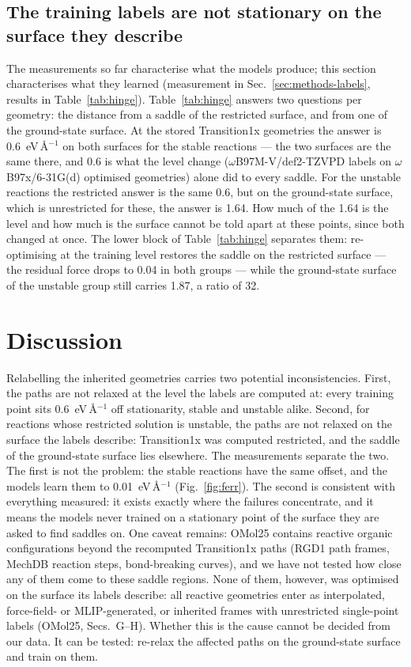 \subsection{The training labels are not stationary on the surface they describe}
The measurements so far characterise what the models produce; this section
characterises what they learned (measurement in
Sec.~\ref{sec:methods-labels}, results in Table~\ref{tab:hinge}).
Table~\ref{tab:hinge} answers two questions per geometry: the distance from
a saddle of the restricted surface, and from one of the ground-state
surface.
At the stored Transition1x geometries the answer is 0.6~eV\,\AA$^{-1}$ on
both surfaces for the stable reactions --- the two surfaces are the same
there, and 0.6 is what the level change ($\omega$B97M-V/def2-TZVPD labels
on $\omega$B97x/6-31G(d) optimised geometries) alone did to every saddle.
For the unstable reactions the restricted answer is the same 0.6, but on
the ground-state surface, which is unrestricted for these, the answer is
1.64.
How much of the 1.64 is the level and how much is the surface cannot be
told apart at these points, since both changed at once.
The lower block of Table~\ref{tab:hinge} separates them: re-optimising at
the training level restores the saddle on the restricted surface --- the
residual force drops to 0.04 in both groups --- while the ground-state
surface of the unstable group still carries 1.87, a ratio of 32.

\section{Discussion}

Relabelling the inherited geometries carries two potential inconsistencies.
First, the paths are not relaxed at the level the labels are computed at:
every training point sits 0.6~eV\,\AA$^{-1}$ off stationarity, stable and
unstable alike.
Second, for reactions whose restricted solution is unstable, the paths are
not relaxed on the surface the labels describe: Transition1x was computed
restricted, and the saddle of the ground-state surface lies elsewhere.
The measurements separate the two.
The first is not the problem: the stable reactions have the same offset, and
the models learn them to 0.01~eV\,\AA$^{-1}$ (Fig.~\ref{fig:ferr}).
The second is consistent with everything measured: it exists exactly where
the failures concentrate, and it means the models never trained on a
stationary point of the surface they are asked to find saddles on.
One caveat remains: OMol25 contains reactive organic configurations beyond
the recomputed Transition1x paths (RGD1 path frames, MechDB reaction steps,
bond-breaking curves), and we have not tested how close any of them come to
these saddle regions.
None of them, however, was optimised on the surface its labels describe: all
reactive geometries enter as interpolated, force-field- or MLIP-generated, or
inherited frames with unrestricted single-point labels (OMol25, Secs.~G--H).
Whether this is the cause cannot be decided from our data.
It can be tested: re-relax the affected paths on the ground-state surface
and train on them.
